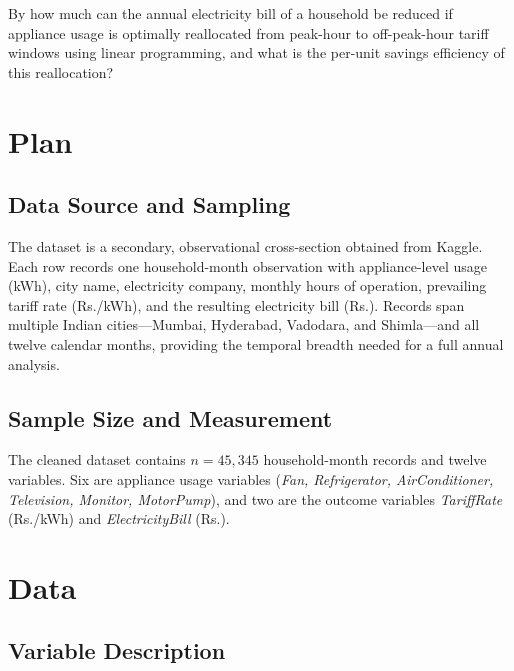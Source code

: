\documentclass[12pt,a4paper]{article}
\begin{document}
By how much can the annual electricity bill of a household be reduced if appliance
usage is optimally reallocated from peak-hour to off-peak-hour tariff windows using
linear programming, and what is the per-unit savings efficiency of this reallocation?

\section{Plan}

\subsection{Data Source and Sampling}

The dataset is a secondary, observational cross-section obtained from Kaggle.
Each row records one household-month observation with appliance-level usage (kWh),
city name, electricity company, monthly hours of operation, prevailing tariff rate
(Rs./kWh), and the resulting electricity bill (Rs.). Records span multiple Indian
cities---Mumbai, Hyderabad, Vadodara, and Shimla---and all twelve calendar months,
providing the temporal breadth needed for a full annual analysis.

\subsection{Sample Size and Measurement}

The cleaned dataset contains $n = 45{,}345$ household-month records and twelve
variables. Six are appliance usage variables (\textit{Fan, Refrigerator,
AirConditioner, Television, Monitor, MotorPump}), and two are the outcome variables
\textit{TariffRate} (Rs./kWh) and \textit{ElectricityBill} (Rs.).

\section{Data}

\subsection{Variable Description}
\end{document}

